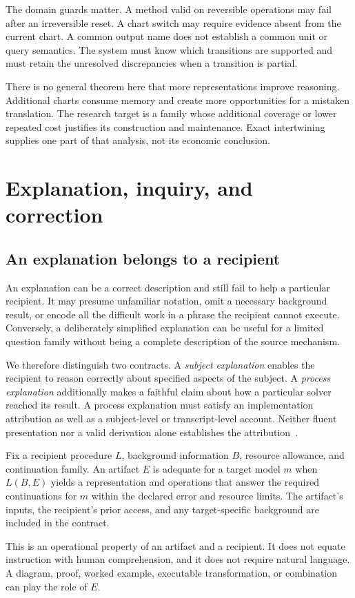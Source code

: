 The domain guards matter. A method valid on reversible operations may fail after an irreversible reset. A chart switch may require evidence absent from the current chart. A common output name does not establish a common unit or query semantics. The system must know which transitions are supported and must retain the unresolved discrepancies when a transition is partial.

There is no general theorem here that more representations improve reasoning. Additional charts consume memory and create more opportunities for a mistaken translation. The research target is a family whose additional coverage or lower repeated cost justifies its construction and maintenance. Exact intertwining supplies one part of that analysis, not its economic conclusion.


\chapter{Explanation, inquiry, and correction}\label{MU:book:chapter-47}


\section{An explanation belongs to a recipient}\label{MU:sec:explanation}
An explanation can be a correct description and still fail to help a particular recipient. It may presume unfamiliar notation, omit a necessary background result, or encode all the difficult work in a phrase the recipient cannot execute. Conversely, a deliberately simplified explanation can be useful for a limited question family without being a complete description of the source mechanism.

We therefore distinguish two contracts. A \emph{subject explanation} enables the recipient to reason correctly about specified aspects of the subject. A \emph{process explanation} additionally makes a faithful claim about how a particular solver reached its result. A process explanation must satisfy an implementation attribution as well as a subject-level or transcript-level account. Neither fluent presentation nor a valid derivation alone establishes the attribution~\cite{MU:jacovi}.

\begin{MUdefinition}\label{MU:def:explanation}
Fix a recipient procedure $L$, background information $B$, resource allowance, and continuation family. An artifact $E$ is adequate for a target model $m$ when $L(B,E)$ yields a representation and operations that answer the required continuations for $m$ within the declared error and resource limits. The artifact's inputs, the recipient's prior access, and any target-specific background are included in the contract.
\end{MUdefinition}
This is an operational property of an artifact and a recipient. It does not equate instruction with human comprehension, and it does not require natural language. A diagram, proof, worked example, executable transformation, or combination can play the role of $E$.

